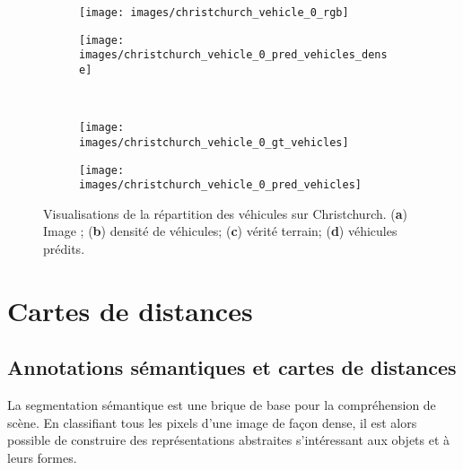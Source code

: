 \unskip
\begin{figure}[t]
  \centering
  \begin{subfigure}{0.35\textwidth}
    \texttt{[image: images/christchurch\_vehicle\_0\_rgb]}
    \caption{}
  \end{subfigure}
  \hspace{0.1\textwidth}
  \begin{subfigure}{0.35\textwidth}
    \texttt{[image: images/christchurch\_vehicle\_0\_pred\_vehicles\_dense]}
    \caption{}
  \end{subfigure}\\
  \begin{subfigure}{0.35\textwidth}
    \texttt{[image: images/christchurch\_vehicle\_0\_gt\_vehicles]}
    \caption{}
  \end{subfigure}
  \hspace{0.1\textwidth}
  \begin{subfigure}{0.35\textwidth}
    \texttt{[image: images/christchurch\_vehicle\_0\_pred\_vehicles]}
    \caption{}
  \end{subfigure}\vspace{-12pt}
  \caption{Visualisations de la répartition des véhicules sur Christchurch. (\textbf{a}) Image ; (\textbf{b}) densité de véhicules; (\textbf{c}) vérité terrain; (\textbf{d}) véhicules prédits.}
  \label{fig:vehicle_density_maps_christchurch}
\end{figure}

\section{Cartes de distances}

\subsection{Annotations sémantiques et cartes de distances}

La segmentation sémantique est une brique de base pour la compréhension de scène. En classifiant tous les pixels d'une image de façon dense, il est alors possible de construire des représentations abstraites s'intéressant aux objets et à leurs formes.


